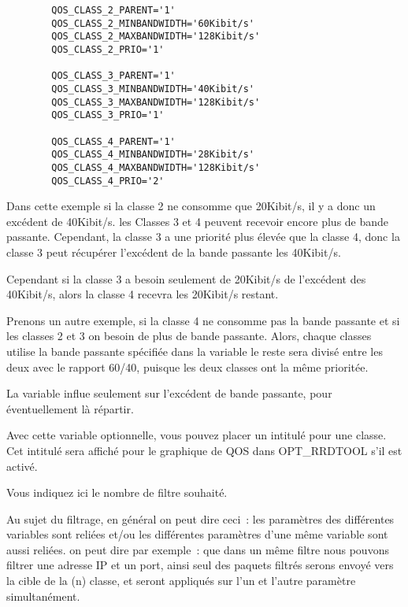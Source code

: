 \begin{description}
\begin{example}
\begin{verbatim}
        QOS_CLASS_2_PARENT='1'
        QOS_CLASS_2_MINBANDWIDTH='60Kibit/s'
        QOS_CLASS_2_MAXBANDWIDTH='128Kibit/s'
        QOS_CLASS_2_PRIO='1'

        QOS_CLASS_3_PARENT='1'
        QOS_CLASS_3_MINBANDWIDTH='40Kibit/s'
        QOS_CLASS_3_MAXBANDWIDTH='128Kibit/s'
        QOS_CLASS_3_PRIO='1'

        QOS_CLASS_4_PARENT='1'
        QOS_CLASS_4_MINBANDWIDTH='28Kibit/s'
        QOS_CLASS_4_MAXBANDWIDTH='128Kibit/s'
        QOS_CLASS_4_PRIO='2'
\end{verbatim}
\end{example}

    Dans cette exemple si la classe 2 ne consomme que 20Kibit/s, il y a donc
    un excédent de 40Kibit/s. les Classes 3 et 4 peuvent recevoir encore
    plus de bande passante. Cependant, la classe 3 a une priorité plus élevée
    que la classe 4, donc la classe 3 peut récupérer l'excédent de la bande
    passante les 40Kibit/s.

    Cependant si la classe 3 a besoin seulement de 20Kibit/s de l'excédent
    des 40Kibit/s, alors la classe 4 recevra les 20Kibit/s restant.

    Prenons un autre exemple, si la classe 4 ne consomme pas la bande passante
    et si les classes 2 et 3 on besoin de plus de bande passante. Alors, chaque
    classes utilise la bande passante spécifiée dans la variable
     le reste sera divisé entre les deux
    avec le rapport 60/40, puisque les deux classes ont la même prioritée.

    La variable  influe seulement sur
    l'excédent de bande passante, pour éventuellement là répartir.


    Avec cette variable optionnelle, vous pouvez placer un intitulé pour une classe.
    Cet intitulé sera affiché pour le graphique de QOS dans OPT\_RRDTOOL s'il est activé.


    Vous indiquez ici le nombre de filtre souhaité.

    Au sujet du filtrage, en général on peut dire ceci~: les paramètres
    des différentes variables sont reliées et/ou les différentes paramètres
    d'une même variable sont aussi reliées. on peut dire par exemple~: que dans
    un même filtre nous pouvons filtrer une adresse IP et un port, ainsi seul
    des paquets filtrés serons envoyé vers la cible de la (n) classe, et
    seront appliqués sur l'un et l'autre paramètre simultanément.


\end{description}
